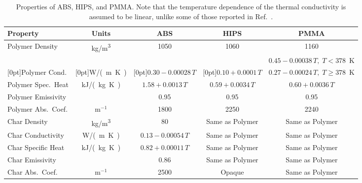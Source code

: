 \begin{table}[h!]
\caption[Properties of ABS, HIPS, and PMMA]{Properties of ABS, HIPS, and PMMA. Note that the temperature dependence of the thermal conductivity is assumed to be linear, unlike some of those reported in Ref.~\cite{Li:Thesis}.}
\centering
\begin{tabular*}{\textwidth}{|l|@{\extracolsep\fill}c@{\extracolsep\fill}|c|c|c|}
\hline
Property                    & Units         & ABS                     & HIPS                    & PMMA                     \\ \hline \hline
Polymer Density             & \unit{kg/m^3}      & 1050                    & 1060                    & 1160                     \\ \hline
                            &               &                         &                         & $0.45-0.00038 \, T, \; T<378$~K      \\
\raisebox{1.5ex}[0pt]{Polymer Cond.}        & \raisebox{1.5ex}[0pt]{\unit{W/(m.K)}}         & \raisebox{1.5ex}[0pt]{$0.30-0.00028 \, T$}  & \raisebox{1.5ex}[0pt]{$0.10+0.0001  \, T$} & $0.27-0.00024 \, T, \; T\ge 378$~K  \\ \hline
Polymer Spec.~Heat          & \unit{kJ/(kg.K)}       & $1.58+0.0013  \, T$     & $0.59+0.0034  \, T$     & $0.60+0.0036  \, T$      \\ \hline
Polymer Emissivity          &               & 0.95                    & 0.95                    & 0.95                     \\ \hline
Polymer Abs.~Coef.          & m$^{-1}$      & 1800                    & 2250                    & 2240                     \\ \hline
Char Density                & \unit{kg/m^3}      & 80                      & Same as Polymer         & Same as Polymer          \\ \hline
Char Conductivity           & \unit{W/(m.K)}& $0.13-0.00054 \, T$     & Same as Polymer         & Same as Polymer          \\ \hline
Char Specific Heat          & \unit{kJ/(kg.K)}       & $0.82+0.00011 \, T$     & Same as Polymer         & Same as Polymer          \\ \hline
Char Emissivity             &               & 0.86                    & Same as Polymer         & Same as Polymer          \\ \hline
Char Abs.~Coef.             & m$^{-1}$      & 2500                    & Opaque                  & Same as Polymer          \\ \hline

\end{tabular*}
\end{table}
